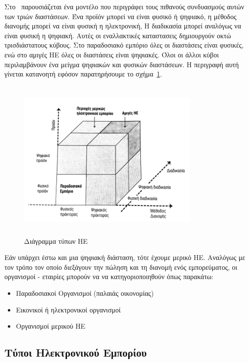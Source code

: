 \documentclass[12pt]{report}
\begin{document}
Στο~\cite{choi_stahl_whinston_1997} παρουσιάζεται ένα μοντέλο που περιγράφει τους πιθανούς συνδυασμούς αυτών των τριών διαστάσεων. Ένα προϊόν μπορεί να είναι φυσικό ή ψηφιακό, η μέθοδος διανομής μπορεί να είναι φυσική η ηλεκτρονική, Η διαδικασία μπορεί αναλόγως να είναι φυσική η ψηφιακή. Αυτές οι εναλλακτικές καταστασεις δημιουργούν οκτώ τρισδιάστατους κύβους. Στο παραδοσιακό εμπόριο όλες οι διαστάσεις είναι φυσικές, ενώ στο αμιγές ΗΕ όλες οι διαστάσεις είναι ψηφιακές. Όλοι οι άλλοι κύβοι περιλαμβάνουν ένα μείγμα ψηφιακών και φυσικών διαστάσεων. Η περιγραφή αυτή γίνεται κατανοητή εφόσον παρατηρήσουμε το σχήμα~\ref{fig:ec_dimensions}.
\begin{figure}[h]
\centering
\includegraphics[width=0.8\textwidth, height=8cm]{ec-dimensions}
\caption{Διάγραμμα τύπων ΗΕ}
\label{fig:ec_dimensions}
\end{figure}
Εάν υπάρχει έστω και μια ψηφιακή διάσταση, τότε έχουμε μερικό ΗΕ. Αναλόγως με τον τρόπο τον οποίο διεξάγουν την πώληση και τη διανομή ενός εμπορεύματος, οι οργανισμοί - εταιρίες μπορούν να να κατηγοριοποιηθούν όπως παρακάτω:
\begin{itemize}
  \item Παραδοσιακοί Οργανισμοί (παλαιάς οικονομίας)
  \item Εικονικοί ή ηλεκτρονικοί οργανισμοί
  \item Οργανισμοί μερικού ΗΕ
\end{itemize}


\subsection{Τύποι Ηλεκτρονικού Εμπορίου}
\end{document}
